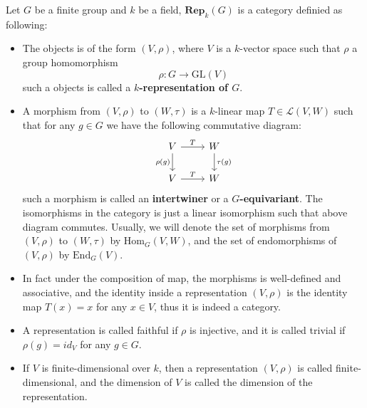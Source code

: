 \begin{definition}
    Let \(G\) be a finite group and \(k\) be a field, \(\mathbf{Rep}_k(G)\) is a category definied as following:
\begin{itemize}
    \item The objects is of the form \((V,\rho)\), where \(V\) is a \(k\)-vector space such that \(\rho\) a group homomorphism 
    \[\rho : G \to \mathrm{GL}(V)\]
    such a objects is called a \textbf{\(k\)-representation of \(G\)}.

    \item A morphism from \((V,\rho)\) to \((W,\tau)\) is a \(k\)-linear map \(T \in \mathcal{L}(V,W)\) such that for any \(g \in G\) we have the following commutative diagram:
\[\begin{tikzcd}
	V & W \\
	V & W
	\arrow["T", from=1-1, to=1-2]
	\arrow["{\rho(g)}"', from=1-1, to=2-1]
	\arrow["{\tau(g)}", from=1-2, to=2-2]
	\arrow["T", from=2-1, to=2-2]
\end{tikzcd}\]
    such a morphism is called an \textbf{intertwiner} or a \textbf{\(G\)-equivariant}. The isomorphisms in the category is just a linear isomorphism such that above diagram commutes. Usually, we will denote the set of morphisms from \((V,\rho)\) to \((W,\tau)\) by \(\mathrm{Hom}_G(V,W)\), and the set of endomorphisms of \((V,\rho)\) by \(\mathrm{End}_G(V)\).    

    \item In fact under the composition of map, the morphisms is well-defined and associative, and the identity inside a representation \((V,\rho)\) is the identity map \(T(x) = x\) for any \(x \in V\), thus it is indeed a category.
    
    \item A representation is called faithful if \(\rho\) is injective, and it is called trivial if \(\rho(g) = id_V\) for any \(g \in G\).
    
    \item If \(V\) is finite-dimensional over \(k\), then a representation \((V,\rho)\) is called finite-dimensional, and the dimension of \(V\) is called the dimension of the representation.


\end{itemize}
\end{definition}

